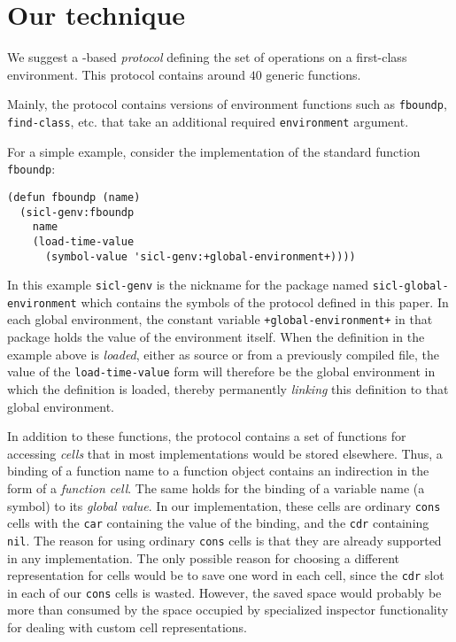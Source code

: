 \section{Our technique}

We suggest a \clos{}-based \emph{protocol} defining the set of
operations on a first-class environment.  This protocol contains
around $40$ generic functions.

Mainly, the protocol contains versions of \commonlisp{} environment
functions such as \texttt{fboundp}, \texttt{find-class}, etc. that
take an additional required \texttt{environment} argument.

For a simple example, consider the \sicl{} implementation of the
standard \commonlisp{} function \texttt{fboundp}:

{\small\begin{verbatim}
(defun fboundp (name)
  (sicl-genv:fboundp
    name
    (load-time-value
      (symbol-value 'sicl-genv:+global-environment+))))
\end{verbatim}}

In this example \texttt{sicl-genv} is the nickname for the package
named \texttt{sicl-global-environment} which contains the symbols of
the protocol defined in this paper.  In each global environment, the
constant variable \texttt{+global-environment+} in that package holds
the value of the environment itself.  When the definition in the
example above is \emph{loaded}, either as source or from a previously
compiled file, the value of the \texttt{load-time-value} form will
therefore be the global environment in which the definition is loaded,
thereby permanently \emph{linking} this definition to that global
environment.

In addition to these functions, the protocol contains a set of
functions for accessing \emph{cells} that in most implementations
would be stored elsewhere.  Thus, a binding of a function name to a
function object contains an indirection in the form of a
\emph{function cell}.  The same holds for the binding of a variable
name (a symbol) to its \emph{global value}.  In our implementation,
these cells are ordinary \texttt{cons} cells with the \texttt{car}
containing the value of the binding, and the \texttt{cdr} containing
\texttt{nil}.  The reason for using ordinary \texttt{cons} cells is
that they are already supported in any \commonlisp{} implementation.
The only possible reason for choosing a different representation for
cells would be to save one word in each cell, since the \texttt{cdr}
slot in each of our \texttt{cons} cells is wasted.  However, the saved
space would probably be more than consumed by the space occupied by
specialized inspector functionality for dealing with custom cell
representations.

